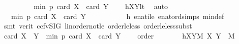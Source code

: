 \begin{isabellebody}
\ \ \ \ \isamarkupfalse%
\ \isamarkupfalse%
\ {\isachardoublequoteopen}{\isachardot}{\kern0pt}{\isachardot}{\kern0pt}{\isachardot}{\kern0pt}\ {\isacharless}{\kern0pt}\ min\ p\ {\isacharparenleft}{\kern0pt}card\ X\ {\isacharplus}{\kern0pt}\ card\ Y\ {\isacharminus}{\kern0pt}\ {}{\isacharparenright}{\kern0pt}{\isachardoublequoteclose}\ \isamarkupfalse%
\ hXYlt\ \isamarkupfalse%
\ auto\isanewline
\ \ \ \ \isamarkupfalse%
\ \isamarkupfalse%
\ {\isachardoublequoteopen}{\isachardot}{\kern0pt}{\isachardot}{\kern0pt}{\isachardot}{\kern0pt}\ {\isasymle}\ min\ p\ {\isacharparenleft}{\kern0pt}card\ {\isacharquery}{\kern0pt}X{}\ {\isacharplus}{\kern0pt}\ card\ {\isacharquery}{\kern0pt}Y{}\ {\isacharminus}{\kern0pt}\ {}{\isacharparenright}{\kern0pt}{\isachardoublequoteclose}\ \isanewline
\ \ \ \ \ \ \isamarkupfalse%
\ h\ enat{\isacharunderscore}{\kern0pt}ile\ enat{\isacharunderscore}{\kern0pt}ord{\isacharunderscore}{\kern0pt}simps{\isacharparenleft}{\kern0pt}{}{\isacharparenright}{\kern0pt}\ min{\isacharunderscore}{\kern0pt}def\isanewline
\ \ \ \ \ \ \isamarkupfalse%
\ {\isacharparenleft}{\kern0pt}smt\ {\isacharparenleft}{\kern0pt}verit{\isacharcomma}{\kern0pt}\ ccfv{\isacharunderscore}{\kern0pt}SIG{\isacharparenright}{\kern0pt}\ linorder{\isacharunderscore}{\kern0pt}not{\isacharunderscore}{\kern0pt}le\ order{\isacharunderscore}{\kern0pt}le{\isacharunderscore}{\kern0pt}less\ order{\isacharunderscore}{\kern0pt}le{\isacharunderscore}{\kern0pt}less{\isacharunderscore}{\kern0pt}subst{}{\isacharparenright}{\kern0pt}\isanewline
\ \ \ \ \isamarkupfalse%
\ \isamarkupfalse%
\ {\isachardoublequoteopen}card\ {\isacharparenleft}{\kern0pt}{\isacharquery}{\kern0pt}X{}\ {\isasymcdots}\ {\isacharquery}{\kern0pt}Y{}{\isacharparenright}{\kern0pt}\ {\isacharless}{\kern0pt}\ min\ p\ {\isacharparenleft}{\kern0pt}card\ {\isacharquery}{\kern0pt}X{}\ {\isacharplus}{\kern0pt}\ card\ {\isacharquery}{\kern0pt}Y{}\ {\isacharminus}{\kern0pt}\ {}{\isacharparenright}{\kern0pt}{\isachardoublequoteclose}\ \isamarkupfalse%
\ order\isanewline
\ \ \ \ \isamarkupfalse%
\ \isamarkupfalse%
\ hXY{}M{\isacharcolon}{\kern0pt}\ {\isachardoublequoteopen}{\isacharparenleft}{\kern0pt}{\isacharquery}{\kern0pt}X{}{\isacharcomma}{\kern0pt}\ {\isacharquery}{\kern0pt}Y{}{\isacharparenright}{\kern0pt}\ {\isasymin}\ M{\isachardoublequoteclose}\ \isamarkupfalse%

\end{isabellebody}
